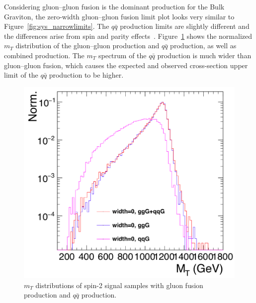 \vspace{0.3cm}
Considering gluon–gluon fusion is the dominant production for the Bulk Graviton, the zero-width gluon–gluon fusion limit plot looks very similar to Figure~\ref{fig:sys_narrowlimits}. The $q\bar{q}$ production limits are slightly different and the differences arise from spin and parity effects~\cite{sys_resoproduction}. Figure~\ref{fig:sys_ggqqdiff} shows the normalized $m_T$ distribution of the gluon–gluon production and $q\bar{q}$ production, as well as combined production. The $m_T$ spectrum of the $q\bar{q}$ production is much wider than gluon–gluon fusion, which causes the expected and observed cross-section upper limit of the $q\bar{q}$ production to be higher.
\begin{figure}[htbp]
\begin{center}
\includegraphics[width=0.9\linewidth]{figures/sys_ggqqdiff.png}
\caption{$m_T$ distributions of spin-2 signal samples with gluon fusion production and $q\bar{q}$ production.}
\label{fig:sys_ggqqdiff}
\end{center}
\end{figure}
